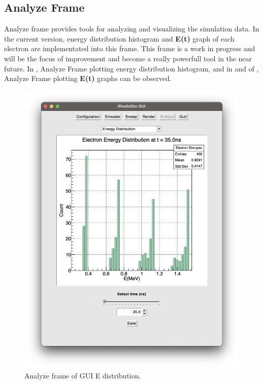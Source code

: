 \documentclass[a4paper,oneside,12pt]{report}
\numberwithin{equation}{chapter}
\begin{document}
{\subsection{Analyze Frame}
Analyze frame provides tools for analyzing and visualizing the simulation data. 
In the current version, energy distribution histogram and \textbf{E(t)} graph of each electron are implementated into this frame.
This frame is a work in progress and will be the focus of improvement and become a really powerfull tool in the near future.
In , Analyze Frame plotting energy distribution histogram, and in  and  of , Analyze Frame plotting \textbf{E(t)} graphs can be observed.
\vspace{10pt}
\begin{figure}[h!]
    \centering
    \includegraphics[width=0.8\linewidth]{./figures/rhodoSim/GUI_analyze_Edist_2.png}
    \caption{Analyze frame of GUI E distribution.}
    \label{fig:gui_analyze_Edist}
\end{figure}

}
\end{document}
